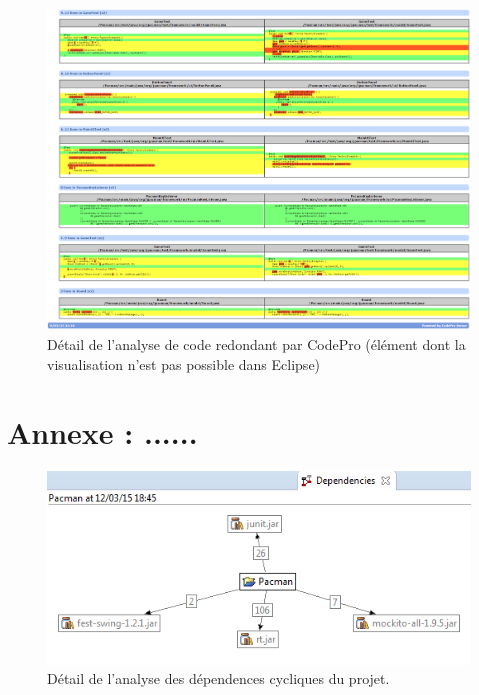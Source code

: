 \documentclass[12pt,a4paper,final]{article}
\begin{document}
\begin{figure}
	\centering
	\includegraphics[width=\textwidth]{images/SimilarCode_5.png}
	\caption{\label{SimilarCode5}Détail de l'analyse de code redondant par CodePro (élément dont la visualisation n'est pas possible dans Eclipse)}
\end{figure}


\newpage
\section{Annexe : ......}\label{Dependencies}

\begin{figure}
	\centering
	\includegraphics[width=\textwidth]{images/DependenciesProject.png}
	\caption{\label{deadcode}Détail de l'analyse des dépendences cycliques du projet.}
\end{figure}
\end{document}
